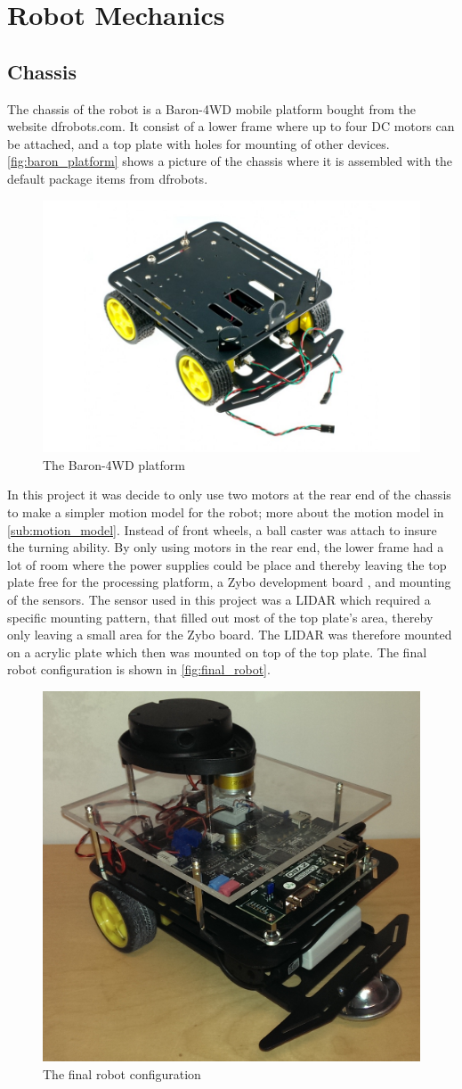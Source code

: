 \documentclass[Main]{subfiles}
\begin{document}
\section{Robot Mechanics} %
	\label{sec:robot_mechanics}

	\subsection{Chassis} %
		\label{sub:chassis}
The chassis of the robot is a Baron-4WD mobile platform bought from the website dfrobots.com. 
It consist of a lower frame where up to four DC motors can be attached, and a top plate with holes for mounting of other devices. 
\autoref{fig:baron_platform} shows a picture of the chassis where it is assembled with the default package items from dfrobots.
\begin{figure}[H]
	\centering
	\includegraphics[width=0.5\linewidth]{./Figures/baron_platform.jpg}
	\caption{The Baron-4WD platform}
	\label{fig:baron_platform}
\end{figure}\noindent
In this project it was decide to only use two motors at the rear end of the chassis to make a simpler motion model for the robot; more about the motion model in \autoref{sub:motion_model}. 
Instead of front wheels, a ball caster was attach to insure the turning ability. 
By only using motors in the rear end, the lower frame had a lot of room where the power supplies could be place and thereby leaving the top plate free for the processing platform, a Zybo development board , and mounting of the sensors. 
The sensor used in this project was a LIDAR  which required a specific mounting pattern, that filled out most of the top plate's area, thereby only leaving a small area for the Zybo board. 
The LIDAR was therefore mounted on a acrylic plate which then was mounted on top of the top plate. 
The final robot configuration is shown in \autoref{fig:final_robot}.
\begin{figure}[H]
	\centering
	\includegraphics[width=0.5\linewidth]{./Figures/final_robot.png}
	\caption{The final robot configuration}
	\label{fig:final_robot}
\end{figure}\noindent
\end{document}

